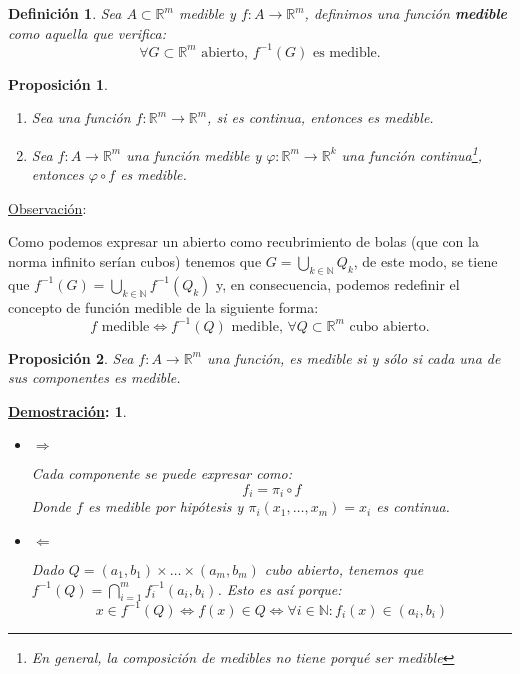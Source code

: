 \documentclass[10pt,a4paper,openright]{book}
\theoremstyle{break}
\newtheorem*{defi}{Definición}
\newtheorem*{prop}{Proposición}
\newtheorem*{demo}{\underline{Demostración}:}
\begin{document}
\begin{defi}
Sea $A \subset \mathbb{R}^m$ medible y $f: A \rightarrow \mathbb{R}^m$, definimos una función \textbf{medible} como aquella que verifica:
$$\forall G \subset \mathbb{R}^m \text{ abierto, } f^{-1}(G) \text{ es medible}.$$ 
\end{defi}

\begin{prop}
\begin{enumerate}
\item Sea una función $f: \mathbb{R}^m \to \mathbb{R}^m$, si es continua, entonces es medible.

\item Sea $f: A \to \mathbb{R}^m$ una función medible y $\varphi: \mathbb{R}^m \to \mathbb{R}^k$ una función continua\footnote{En general, la composición de medibles no tiene porqué ser medible}, entonces $\varphi \circ f$ es medible.
\end{enumerate}
\end{prop}

\underline{Observación}:

Como podemos expresar un abierto como recubrimiento de bolas (que con la norma infinito serían cubos) tenemos que $G = \bigcup_{k \in \mathbb{N}} Q_k$, de este modo, se tiene que $f^{-1}\left( G \right) = \bigcup_{k \in \mathbb{N}}f^{-1}\left( Q_k \right)$ y, en consecuencia, podemos redefinir el concepto de función medible de la siguiente forma:
$$f \text{ medible} \Leftrightarrow f^{-1}\left( Q \right) \text{ medible, } \forall Q \subset \mathbb{R}^m \text{ cubo abierto.}$$


\begin{prop}
Sea $f: A \to \mathbb{R}^m$ una función, es medible si y sólo si cada una de sus componentes es medible.
\end{prop}
\begin{demo}
\begin{itemize}
\item $\Rightarrow$

Cada componente se puede expresar como:
$$f_i = \pi_i \circ f$$
Donde $f$ es medible por hipótesis y $\pi_i\left( x_1, \ldots, x_m \right) = x_i$ es continua.

\item $\Leftarrow$

Dado $Q = \left( a_1, b_1 \right) \times \ldots \times \left( a_m, b_m \right)$ cubo abierto, tenemos que $f^{-1}\left( Q \right) = \bigcap_{i = 1}^{m} f_i^{-1}\left( a_i, b_i \right)$. Esto es así porque:
$$x \in f^{-1}\left( Q \right) \Leftrightarrow f\left( x \right) \in Q \Leftrightarrow \forall i \in \mathbb{N} : f_i\left( x \right) \in \left( a_i, b_i \right)$$
\end{itemize}
\end{demo}
\end{document}
